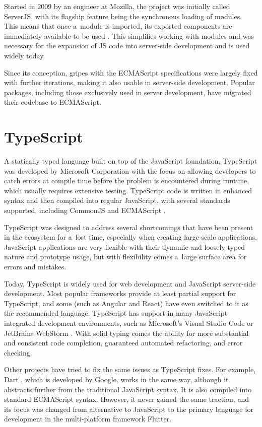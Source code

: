 Started in 2009 by an engineer at Mozilla, the project was initially called
ServerJS, with its flagship feature being the synchronous loading of modules.
This means that once a~module is imported, its exported components are
immediately available to be used \cite{commonjs-introduction}. This simplifies
working with modules and was necessary for the expansion of JS code into
server-side development and is used widely today. 

Since its conception, gripes with the ECMAScript specifications were largely
fixed with further iterations, making it also usable in server-side development.
Popular packages, including those exclusively used in server development, have
migrated their codebase to ECMAScript.

\section*{TypeScript}
A statically typed language built on top of the JavaScript foundation,
TypeScript was developed by Microsoft Corporation with the focus on allowing
developers to catch errors at compile time before the problem is encountered
during runtime, which usually requires extensive testing. TypeScript code is
written in enhanced syntax and then compiled into regular JavaScript, with
several standards supported, including CommonJS and ECMAScript
\cite{typescript-modules}.

TypeScript was designed to address several shortcomings that have been present
in the ecosystem for a~lost time, especially when creating large-scale
applications. JavaScript applications are very flexible with their dynamic and
loosely typed nature and prototype usage, but with flexibility comes a~large
surface area for errors and mistakes. 

Today, TypeScript is widely used for web development and JavaScript server-side
development. Most popular frameworks provide at least partial support for
TypeScript, and some (such as Angular and React) have even switched to it as the
recommended language. TypeScript has support in many JavaScript-integrated
development environments, such as Microsoft's Visual Studio Code
\cite{typescript-vscode} or JetBrains WebStorm \cite{typescript-webstorm}. With
solid typing comes the ability for more substantial and consistent code
completion, guaranteed automated refactoring, and error checking.

Other projects have tried to fix the same issues as TypeScript fixes. For
example, Dart \cite{dart-homepage}, which is developed by Google, works in the
same way, although it abstracts further from the traditional JavaScript syntax.
It is also compiled into standard ECMAScript syntax. However, it never gained
the same traction, and its focus was changed from alternative to JavaScript to
the primary language for development in the multi-platform framework Flutter.

